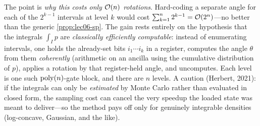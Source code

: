 \begin{remark}
The point is \emph{why this costs only $\mathcal{O}(n)$ rotations}. Hard-coding a separate
angle for each of the $2^{k-1}$ intervals at level $k$ would cost
$\sum_{k=1}^{n}2^{k-1}=\mathcal{O}(2^{n})$---no better than the generic
\cref{prop:lec06-sp}. The gain rests entirely on the hypothesis that the integrals
$\int_{I}p$ are \emph{classically efficiently computable}: instead of enumerating
intervals, one holds the already-set bits $i_1\cdots i_k$ in a register, computes the
angle $\theta$ from them \emph{coherently} (arithmetic on an ancilla using the
cumulative distribution of $p$), applies a rotation by that register-held angle, and
uncomputes. Each level is one such $\operatorname{poly}(n)$-gate block, and there are $n$ levels.
A caution (Herbert, 2021): if the integrals can only be \emph{estimated} by Monte
Carlo rather than evaluated in closed form, the sampling cost can cancel the very
speedup the loaded state was meant to deliver---so the method pays off only for
genuinely integrable densities (log-concave, Gaussian, and the like).
\end{remark}

